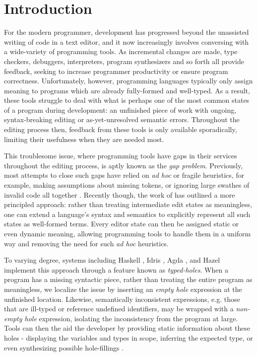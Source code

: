 \section{Introduction}\label{sec:intro}

For the modern programmer, development has progressed beyond the unassisted writing of code in a text editor, and it now increasingly involves conversing with a wide-variety of programming tools. As incremental changes are made, type checkers, debuggers, interpreters, program synthesizers and so forth all provide feedback, seeking to increase programmer productivity or ensure program correctness. Unfortunately, however, programming languages typically only assign meaning to programs which are already fully-formed and well-typed. As a result, these tools struggle to deal with what is perhaps one of the most common states of a program during development: an unfinished piece of work with ongoing, syntax-breaking editing or as-yet-unresolved semantic errors. Throughout the editing process then, feedback from these tools is only available sporadically, limiting their usefulness when they are needed most.

This troublesome issue, where programming tools have gaps in their services throughout the editing process, is aptly known as the \emph{gap problem}. Previously, most attempts to close such gaps have relied on \textit{ad hoc} or fragile heuristics, for example, making assumptions about missing tokens, or ignoring large swathes of invalid code all together \cite{DBLP:conf/oopsla/KatsJNV09, DBLP:conf/snapl/OmarVHSGAH17}. Recently though, the work of  \cite{DBLP:conf/snapl/OmarVHSGAH17} has outlined a more principled approach: rather than treating intermediate edit states as meaningless, one can extend a language's syntax and semantics to explicitly represent all such states as well-formed terms. Every editor state can then be assigned static or even dynamic meaning, allowing programming tools to handle them in a uniform way and removing the need for such \emph{ad hoc} heuristics.

To varying degree, systems including Haskell \cite{GHCHoles}, Idris \cite{DBLP:journals/jfp/Brady13}, Agda \cite{DBLP:conf/icfp/Norell13}, and Hazel \cite{DBLP:conf/popl/OmarVHAH17} implement this approach through a feature known as \emph{typed-holes}. When a program has a missing syntactic piece, rather than treating the entire program as meaningless, we localize the issue by inserting an \emph{empty hole} expression at the unfinished location. Likewise, semantically inconsistent expressions, e.g. those that are ill-typed or reference undefined identifiers, may be wrapped with a \emph{non-empty hole} expression, isolating the inconsistency from the program at large. Tools can then the aid the developer by providing static information about these holes - displaying the variables and types in scope, inferring the expected type, or even synthesizing possible hole-fillings \cite{DBLP:conf/haskell/Gissurarson18, DBLP:journals/pacmpl/LubinCOC20}. 

